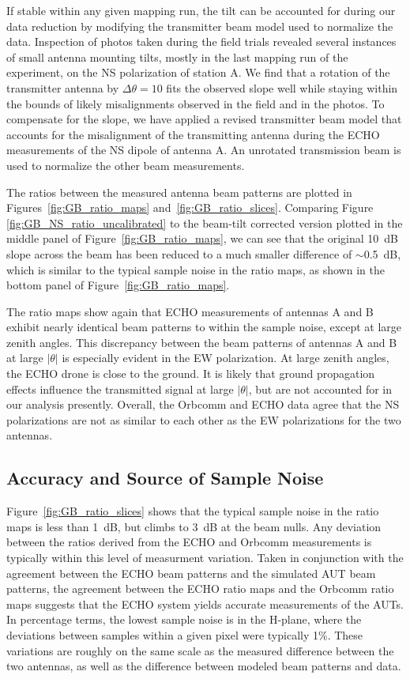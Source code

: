 \documentclass[preprint2,numberedappendix,tighten,twocolappendix]{aastex6}
\begin{document}
If stable within any given mapping run, the tilt can be accounted for during our data reduction by modifying the transmitter beam model used to normalize the data.  Inspection of photos taken during the field trials revealed several instances of small antenna mounting tilts, mostly in the last mapping run of the experiment, on the NS polarization of station A.   We find that a rotation of the transmitter antenna by $\Delta \theta = 10$\arcdeg{} fits the observed slope well while staying within the bounds of likely misalignments observed in the field and in the photos.  To compensate for the slope, we have applied a revised transmitter beam model that accounts for the misalignment of the transmitting antenna during the ECHO measurements of the NS dipole of antenna A.  An unrotated transmission beam is used to normalize  the other beam measurements.  

The ratios between the measured antenna beam patterns are plotted in Figures~\ref{fig:GB_ratio_maps} and~\ref{fig:GB_ratio_slices}.   Comparing Figure \ref{fig:GB_NS_ratio_uncalibrated} to the beam-tilt corrected version plotted in the middle panel of Figure~\ref{fig:GB_ratio_maps}, we can see that the original 10~dB slope across the beam has been reduced to a much smaller difference of  $\sim$0.5~dB, which is similar to the typical sample noise in the ratio maps, as shown in the bottom panel of Figure~\ref{fig:GB_ratio_maps}.   

The ratio maps show again that ECHO measurements of antennas A and B exhibit nearly identical beam patterns to within the sample noise, except at large zenith angles.  This discrepancy between the beam patterns of antennas A and B at large $|\theta|$ is especially evident in the EW polarization. At large zenith angles, the ECHO drone is close to the ground.  It is likely that ground propagation effects influence the transmitted signal at large $|\theta|$, but are not accounted for in our analysis presently.    Overall, the Orbcomm and ECHO data agree that the NS polarizations are not as similar to each other as the EW polarizations for the two antennas.  



\subsection{Accuracy and Source of Sample Noise}

Figure~\ref{fig:GB_ratio_slices} shows that the typical sample noise in the ratio maps is less than 1~dB, but climbs to 3~dB at the beam nulls.  Any deviation between the ratios derived from the ECHO and Orbcomm measurements is typically within this level of measurment variation.  Taken in conjunction with the agreement between the ECHO beam patterns and the simulated AUT beam patterns, the agreement between the ECHO ratio maps and the Orbcomm ratio maps suggests that the ECHO system yields accurate measurements of the AUTs.  In percentage terms, the lowest sample noise is in the H-plane, where the deviations between samples within a given pixel were typically 1\%. These variations are roughly on the same scale as the measured difference between the two antennas, as well as the difference between modeled beam patterns and data.  
\end{document}
